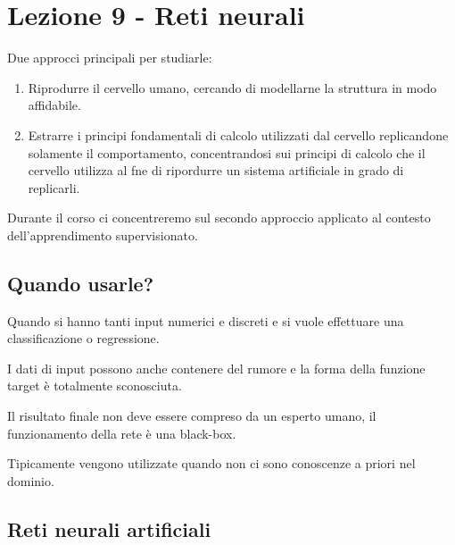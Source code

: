 
\section{Lezione 9 - Reti neurali}\label{lezione-9---reti-neurali}

Due approcci principali per studiarle:

\begin{enumerate}
\item
  Riprodurre il cervello umano, cercando di modellarne la struttura in
  modo affidabile.
\item
  Estrarre i principi fondamentali di calcolo utilizzati dal cervello
  replicandone solamente il comportamento, concentrandosi sui principi
  di calcolo che il cervello utilizza al fne di ripordurre un sistema
  artificiale in grado di replicarli.
\end{enumerate}

Durante il corso ci concentreremo sul secondo approccio applicato al
contesto dell'apprendimento supervisionato.

\subsection{Quando usarle?}\label{quando-usarle}

Quando si hanno tanti input numerici e discreti e si vuole effettuare
una classificazione o regressione.

I dati di input possono anche contenere del rumore e la forma della
funzione target è totalmente sconosciuta.

Il risultato finale non deve essere compreso da un esperto umano, il
funzionamento della rete è una black-box.

Tipicamente vengono utilizzate quando non ci sono conoscenze a priori
nel dominio.

\subsection{Reti neurali artificiali}\label{reti-neurali-artificiali}

